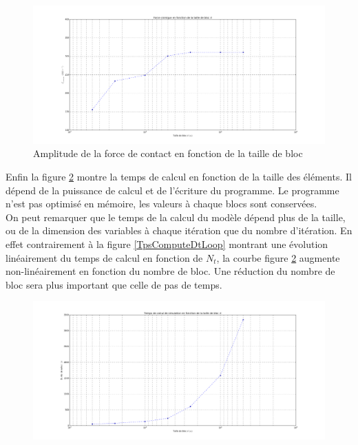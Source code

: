 \documentclass[11pt, a4paper]{article}
\begin{document}
\begin{figure}[h!]
	\centering
	\includegraphics[width=1\linewidth]{figures/Part4/Fsismique.png}
	\caption{Amplitude de la force de contact en fonction de la taille de bloc}
    \label{FcontactDlLoop}
\end{figure}
Enfin la figure \ref{TpsComputeDlLoop} montre la temps de calcul en fonction de la taille des éléments. Il dépend de la puissance de calcul et de l'écriture du programme. Le programme n'est pas optimisé en mémoire, les valeurs à chaque blocs sont conservées. 
\\ On peut remarquer que le temps de la calcul du modèle dépend plus de la taille, ou de la dimension des variables à chaque itération que du nombre d'itération. En effet contrairement à la figure \ref{TpsComputeDtLoop} montrant une évolution linéairement du temps de calcul en fonction de $N_t$, la courbe figure \ref{TpsComputeDlLoop} augmente non-linéairement en fonction du nombre de bloc. Une réduction du nombre de bloc sera plus important que celle de pas de temps.
\\

\begin{figure}[h!]
	\centering
	\includegraphics[width=1\linewidth]{figures/Part4/TpsCompute.png}
	\label{TpsComputeDlLoop}
\end{figure}
\end{document}
